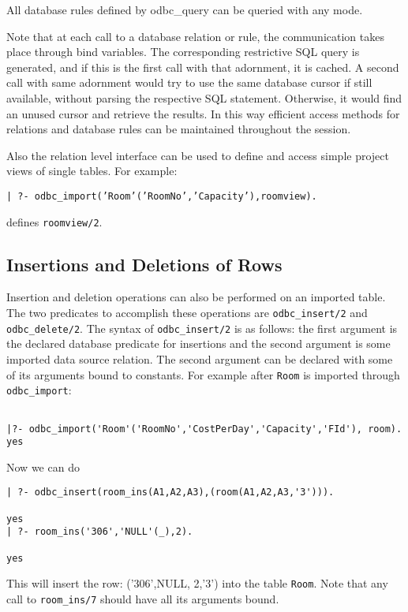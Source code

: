 All database rules defined by odbc\_query can be queried with any mode.

Note that at each call to a database relation or rule, the
communication takes place through bind variables.  The corresponding
restrictive SQL query is generated, and if this is the first call with
that adornment, it is cached.  A second call with same adornment would
try to use the same database cursor if still available, without
parsing the respective SQL statement.  Otherwise, it would find an
unused cursor and retrieve the results.  In this way efficient access
methods for relations and database rules can be maintained throughout
the session.

Also the relation level interface can be used to define and
access simple project views of single tables.  For example:
\begin{center}

{\tt | ?- odbc\_import('Room'('RoomNo','Capacity'),roomview).}
\end{center}
defines {\tt roomview/2}.

\subsection{Insertions and Deletions of Rows}

Insertion and deletion operations can also be performed on an imported
table.  The two predicates to accomplish these operations are 
{\tt odbc\_insert/2} and {\tt odbc\_delete/2}.  The syntax of 
{\tt odbc\_insert/2} is as follows: the first argument is the declared 
database predicate for insertions and the second argument
is some imported data source relation.  The second argument can be 
declared with some of its arguments bound to constants.  For example 
after {\tt Room} is imported through {\tt odbc\_import}:
\begin{verbatim}

|?- odbc_import('Room'('RoomNo','CostPerDay','Capacity','FId'), room).
yes 
\end{verbatim}

Now we can do

\begin{verbatim}
| ?- odbc_insert(room_ins(A1,A2,A3),(room(A1,A2,A3,'3'))).

yes
| ?- room_ins('306','NULL'(_),2).

yes
\end{verbatim}
This will insert the row: ('306',NULL, 2,'3') into the table {\tt Room}. Note that 
any call to {\tt room\_ins/7} should have all its arguments bound.

